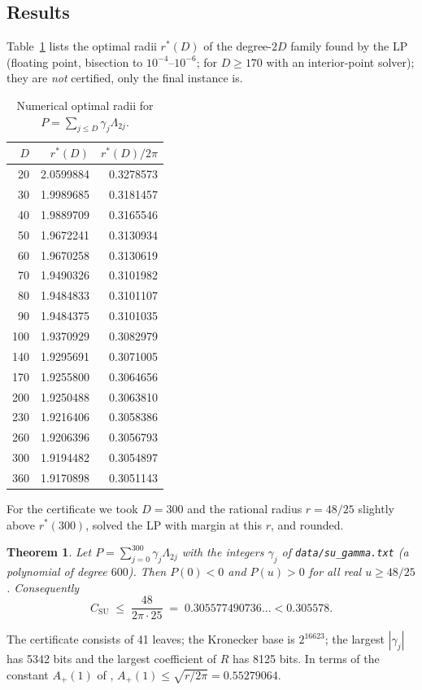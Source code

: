 \documentclass[11pt]{article}
\numberwithin{equation}{section}
\newtheorem{theorem}{Theorem}[section]
\theoremstyle{definition}
\theoremstyle{remark}
\begin{document}
\subsection{Results}
Table~\ref{tab:rstar} lists the optimal radii $r^*(D)$ of the degree-$2D$ family found by the LP (floating
point, bisection to $10^{-4}$--$10^{-6}$; for $D\ge170$ with an interior-point solver); they are \emph{not} certified, only the final instance is.
\begin{table}[h]\centering
\begin{tabular}{rrr}\toprule
$D$ & $r^*(D)$ & $r^*(D)/2\pi$\\\midrule
20 & 2.0599884 & 0.3278573\\
30 & 1.9989685 & 0.3181457\\
40 & 1.9889709 & 0.3165546\\
50 & 1.9672241 & 0.3130934\\
60 & 1.9670258 & 0.3130619\\
70 & 1.9490326 & 0.3101982\\
80 & 1.9484833 & 0.3101107\\
90 & 1.9484375 & 0.3101035\\
100 & 1.9370929 & 0.3082979\\
140 & 1.9295691 & 0.3071005\\
170 & 1.9255800 & 0.3064656\\
200 & 1.9250488 & 0.3063810\\
230 & 1.9216406 & 0.3058386\\
260 & 1.9206396 & 0.3056793\\
300 & 1.9194482 & 0.3054897\\
360 & 1.9170898 & 0.3051143\\
\bottomrule\end{tabular}
\caption{Numerical optimal radii for $P=\sum_{j\le D}\gamma_j\Lambda_{2j}$.}\label{tab:rstar}
\end{table}
For the certificate we took $D=300$ and the rational radius $r=48/25$ slightly above $r^*(300)$, solved the LP
with margin at this $r$, and rounded.
\begin{theorem}\label{thm:su}
Let $P=\sum_{j=0}^{300}\gamma_j\Lambda_{2j}$ with the integers $\gamma_j$ of \texttt{data/su\_gamma.txt}
(a polynomial of degree $600$). Then $P(0)<0$ and $P(u)>0$ for all real $u\ge 48/25$. Consequently
\[
C_{\mathrm{SU}}\;\le\;\frac{48}{2\pi\cdot 25}\;=\;0.305577490736\ldots<0.305578 .
\]
\end{theorem}
The certificate consists of 41 leaves; the Kronecker base is $2^{16623}$; the largest $|\gamma_j|$ has 5342 bits
and the largest coefficient of $R$ has 8125 bits. In terms of the constant $A_+(1)$ of \cite{CG19,QMF26},
$A_+(1)\le\sqrt{r/2\pi}=0.55279064$.
\end{document}
